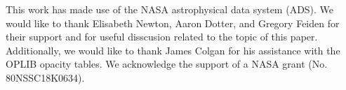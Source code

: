 \documentclass[twocolumn,linenumbers]{src/aastex631}
\begin{document}
%
% 

\begin{acknowledgments}
	This work has made use of the NASA astrophysical data system (ADS). We would
	like to thank Elisabeth Newton, Aaron Dotter, and Gregory Feiden for their
	support and for useful disscusion related to the topic of this paper.
	Additionally, we would like to thank James Colgan for his assistance with
	the OPLIB opacity tables. We acknowledge the support of a NASA grant (No.
	80NSSC18K0634). 
\end{acknowledgments}



{}

\end{document}

